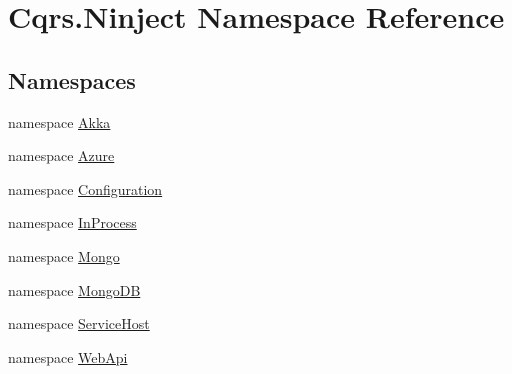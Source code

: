 \hypertarget{namespaceCqrs_1_1Ninject}{}\section{Cqrs.\+Ninject Namespace Reference}
\label{namespaceCqrs_1_1Ninject}
\subsection*{Namespaces}
\begin{DoxyCompactItemize}
\item 
namespace \hyperlink{namespaceCqrs_1_1Ninject_1_1Akka}{Akka}
\item 
namespace \hyperlink{namespaceCqrs_1_1Ninject_1_1Azure}{Azure}
\item 
namespace \hyperlink{namespaceCqrs_1_1Ninject_1_1Configuration}{Configuration}
\item 
namespace \hyperlink{namespaceCqrs_1_1Ninject_1_1InProcess}{In\+Process}
\item 
namespace \hyperlink{namespaceCqrs_1_1Ninject_1_1Mongo}{Mongo}
\item 
namespace \hyperlink{namespaceCqrs_1_1Ninject_1_1MongoDB}{Mongo\+DB}
\item 
namespace \hyperlink{namespaceCqrs_1_1Ninject_1_1ServiceHost}{Service\+Host}
\item 
namespace \hyperlink{namespaceCqrs_1_1Ninject_1_1WebApi}{Web\+Api}
\end{DoxyCompactItemize}

